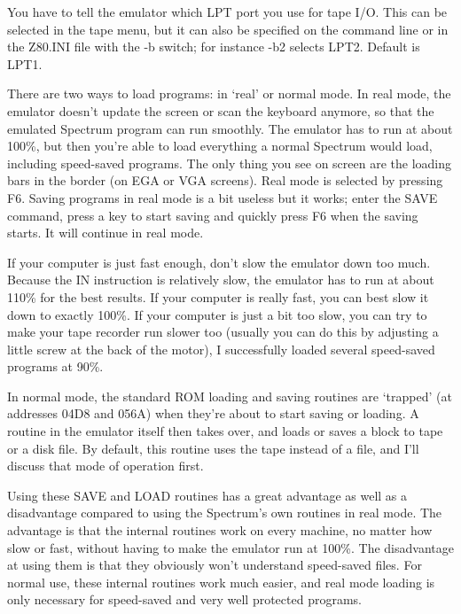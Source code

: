     You have to tell the emulator which LPT port you use for tape I/O.  This
    can be selected in the tape menu, but it can also be specified on the
    command line or in the Z80.INI file with the -b switch; for instance
    -b2 selects LPT2.  Default is LPT1.

    There are two ways to load programs: in `real' or normal mode.  In real
    mode, the emulator doesn't update the screen or scan the keyboard
    anymore, so that the emulated Spectrum program can run smoothly.  The
    emulator has to run at about 100\%, but then you're able to load
    everything a normal Spectrum would load, including speed-saved programs.
    The only thing you see on screen are the loading bars in the border (on
    EGA or VGA screens).  Real mode is selected by pressing F6. Saving
    programs in real mode is a bit useless but it works; enter the SAVE
    command, press a key to start saving and quickly press F6 when the
    saving starts.  It will continue in real mode.

    If your computer is just fast enough, don't slow the emulator down too
    much.  Because the IN instruction is relatively slow, the emulator has
    to run at about 110\% for the best results.  If your computer is really
    fast, you can best slow it down to exactly 100\%.  If your computer is
    just a bit too slow, you can try to make your tape recorder run slower
    too (usually you can do this by adjusting a little screw at the back of
    the motor), I successfully loaded several speed-saved programs at 90\%.

    In normal mode, the standard ROM loading and saving routines are
    `trapped' (at addresses 04D8 and 056A) when they're about to start
    saving or loading.  A routine in the emulator itself then takes over,
    and loads or saves a block to tape or a disk file.  By default, this
    routine uses the tape instead of a file, and I'll discuss that mode of
    operation first.

    Using these SAVE and LOAD routines has a great advantage as well as a
    disadvantage compared to using the Spectrum's own routines in real mode.
    The advantage is that the internal routines work on every machine, no
    matter how slow or fast, without having to make the emulator run at
    100\%.  The disadvantage at using them is that they obviously won't
    understand speed-saved files.  For normal use, these internal routines
    work much easier, and real mode loading is only necessary for
    speed-saved and very well protected programs.

